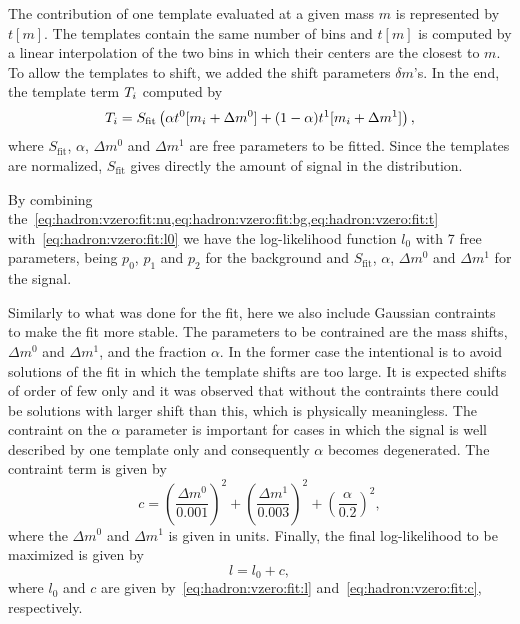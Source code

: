 The contribution of one template evaluated at a given
mass $m$ is represented by $t[m]$. The templates contain
the same number of bins \nmass and $t[m]$ is computed
by a linear interpolation of the two bins
in which their centers are the closest to $m$.
To allow the templates to shift, we added the
shift parameters $\delta m$'s. In the end,
the template term $T_i$ computed by
\begin{equation}
  T_i = S_\text{fit}\left(\alpha t^0[m_i+\Delta m^0]+ (1-\alpha)t^1[m_i+\Delta m^1]\right),
  \label{eq:hadron:vzero:fit:t}
\end{equation}
where $S_\text{fit}$, $\alpha$, $\Delta m^0$ and $\Delta m^1$ are
free parameters to be fitted.
Since the templates are normalized, $S_\text{fit}$ gives
directly the amount of signal in the distribution.

By combining the~\cref{eq:hadron:vzero:fit:nu,eq:hadron:vzero:fit:bg,eq:hadron:vzero:fit:t}
with~\cref{eq:hadron:vzero:fit:l0} we have the log-likelihood function $l_0$
with 7 free parameters, being $p_0$, $p_1$ and $p_2$
for the background and $S_\text{fit}$, $\alpha$, $\Delta m^0$ and $\Delta m^1$
for the signal.

Similarly to what was done for the \dedx fit,
here we also include Gaussian contraints to make the
fit more stable. The parameters to be contrained are
the mass shifts, $\Delta m^0$ and $\Delta m^1$, and the fraction
$\alpha$. In the former case the intentional is to avoid
solutions of the fit in which the template shifts are too large.
It is expected shifts of order of few \MeVc only and it was observed
that without the contraints there could be solutions with
larger shift than this, which is physically meaningless.
The contraint on the $\alpha$ parameter is important
for cases in which the signal is well described by one
template only and consequently $\alpha$ becomes
degenerated. The contraint term is given by
\begin{equation}
  c = \left(\frac{\Delta m^0}{0.001}\right)^2+\left(\frac{\Delta m^1}{0.003}\right)^2
  +\left(\frac{\alpha}{0.2}\right)^2,
  \label{eq:hadron:vzero:fit:c}
\end{equation}
where the $\Delta m^0$ and $\Delta m^1$ is given in \GeVc units.
Finally, the final log-likelihood to be maximized is given by
\begin{equation}
  l = l_0 +c,
  \label{eq:hadron:vzero:fit:l}
\end{equation}
where $l_0$ and $c$ are given by~\cref{eq:hadron:vzero:fit:l}
and~\cref{eq:hadron:vzero:fit:c}, respectively.

